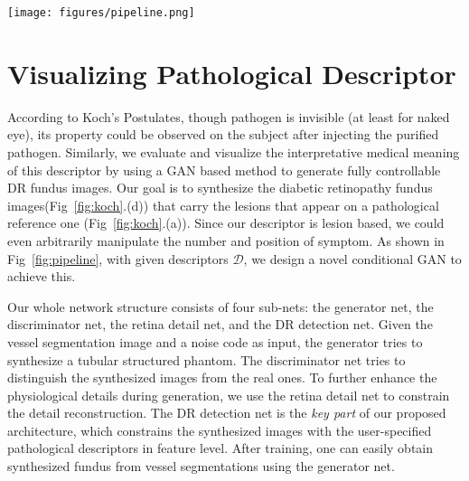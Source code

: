 \documentclass[letterpaper]{article} %
\begin{document}



	\begin{figure*}[h!]
		\begin{center}
			\texttt{[image: figures/pipeline.png]}
		\end{center}
		\caption{The architecture and data flow of our symptom transfer GAN, which contains four nets in training phase. After training, the generator itself is able to synthesize retinal fundus with lesions on specific locations.}
		\label{fig:pipeline}
	\end{figure*}

	\section{Visualizing Pathological Descriptor}

    According to Koch's Postulates, though pathogen is invisible (at least for naked eye), its property could be observed on the subject after injecting the purified pathogen. Similarly, we evaluate and visualize the interpretative medical meaning of this descriptor by using a GAN based method to generate fully controllable DR fundus images.  Our goal is to synthesize the diabetic retinopathy fundus images(Fig~\ref{fig:koch}.(d)) that carry the lesions that appear on a pathological reference one (Fig~\ref{fig:koch}.(a)). Since our descriptor is lesion based, we could even arbitrarily manipulate the number and position of symptom. As shown in Fig~\ref{fig:pipeline}, with given descriptors $ \mathcal{D} $, we design a novel conditional GAN to achieve this.

    Our whole network structure consists of four sub-nets: the generator net, the discriminator net, the retina detail net, and the DR detection net. Given the vessel segmentation image and a noise code as input, the generator tries to synthesize a tubular structured phantom. The discriminator net tries to distinguish the synthesized images from the real ones. To further enhance the physiological details during generation, we use the retina detail net to constrain the detail reconstruction. The DR detection net is the \emph{key part} of our proposed architecture, which constrains the synthesized images with the user-specified pathological descriptors in feature level. After training, one can easily obtain synthesized fundus from vessel segmentations using the generator net.
\end{document}
